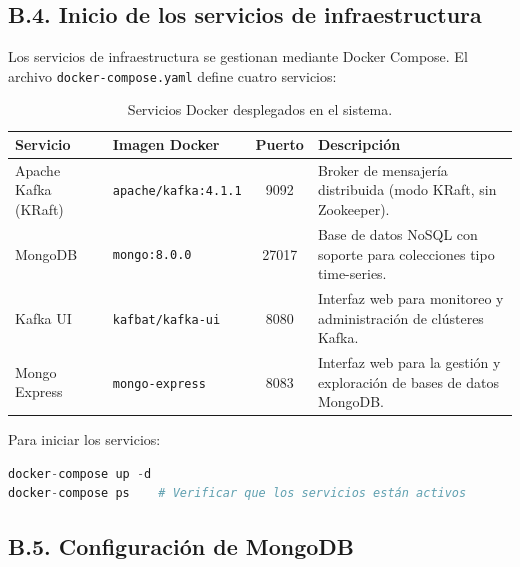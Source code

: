 \documentclass[12pt,a4paper]{article}
\begin{document}
\subsection*{B.4. Inicio de los servicios de infraestructura}

Los servicios de infraestructura se gestionan mediante Docker Compose. El archivo \texttt{docker-compose.yaml} define cuatro servicios:

\begin{table}[h!]
    \centering
    \small
    \renewcommand{\arraystretch}{1.2}
    \begin{tabular}{|l|p{4.5cm}|c|p{6cm}|}
        \hline
        \textbf{Servicio} 
        & \textbf{Imagen Docker} 
        & \textbf{Puerto} 
        & \textbf{Descripción} \\ \hline

        Apache Kafka (KRaft)
        & \texttt{apache/kafka:4.1.1}
        & 9092
        & Broker de mensajería distribuida (modo KRaft, sin Zookeeper). \\ \hline

        MongoDB
        & \texttt{mongo:8.0.0}
        & 27017
        & Base de datos NoSQL con soporte para colecciones tipo time-series. \\ \hline

        Kafka UI
        & \texttt{kafbat/kafka-ui}
        & 8080
        & Interfaz web para monitoreo y administración de clústeres Kafka. \\ \hline

        Mongo Express
        & \texttt{mongo-express}
        & 8083
        & Interfaz web para la gestión y exploración de bases de datos MongoDB. \\ \hline
    \end{tabular}
    \caption{Servicios Docker desplegados en el sistema.}
    \label{tab:servicios_docker}
\end{table}


Para iniciar los servicios:

\begin{lstlisting}[language=Python, caption=docker-compose]
docker-compose up -d
docker-compose ps    # Verificar que los servicios están activos
\end{lstlisting}

\subsection*{B.5. Configuración de MongoDB}
\end{document}
